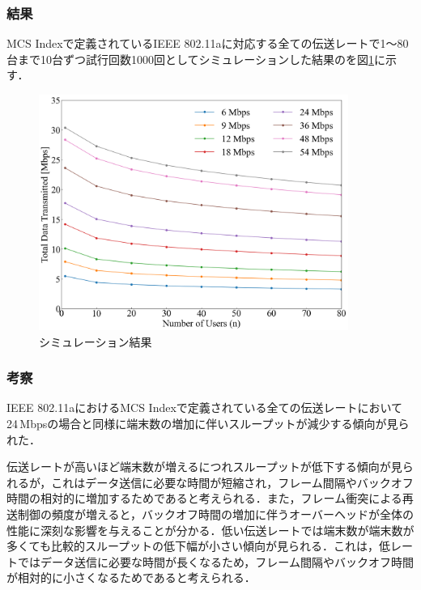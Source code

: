 \documentclass[a4paper,10pt]{ltjsarticle}
\begin{document}
\subsubsection{結果}
MCS Indexで定義されているIEEE 802.11aに対応する全ての伝送レートで1～80台まで10台ずつ試行回数1000回としてシミュレーションした結果のを図\ref{fig:simulation-result-mcs-index}に示す．


\begin{figure}[H]
  \centering
  \includegraphics[width=0.9\textwidth]{./assets/mcs_index.png}
  \caption{シミュレーション結果}
  \label{fig:simulation-result-mcs-index}
\end{figure}

\subsubsection{考察}


IEEE 802.11aにおけるMCS Indexで定義されている全ての伝送レートにおいて24\,Mbpsの場合と同様に端末数の増加に伴いスループットが減少する傾向が見られた．

伝送レートが高いほど端末数が増えるにつれスループットが低下する傾向が見られるが，これはデータ送信に必要な時間が短縮され，フレーム間隔やバックオフ時間の相対的に増加するためであると考えられる．また，フレーム衝突による再送制御の頻度が増えると，バックオフ時間の増加に伴うオーバーヘッドが全体の性能に深刻な影響を与えることが分かる．低い伝送レートでは端末数が端末数が多くても比較的スループットの低下幅が小さい傾向が見られる．これは，低レートではデータ送信に必要な時間が長くなるため，フレーム間隔やバックオフ時間が相対的に小さくなるためであると考えられる．
\end{document}

